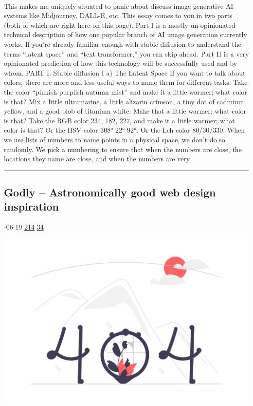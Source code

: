 \documentclass[10pt,a4paper]{article}
\begin{document}
\begin{multicols*}{2}
\paragraph{}
 This makes me uniquely situated to
panic about discuss image-generative AI systems like Midjourney, DALL-E, etc.
This essay comes to you in two parts (both of which are right here on this page).
Part I is a mostly-un-opinionated technical description of how one popular branch of AI image generation currently works. If you’re already familiar enough with stable diffusion to understand the terms “latent space” and “text transformer,” you can skip ahead.
Part II is a very opinionated prediction of how this technology will be successfully used and by whom.
PART I: Stable diffusion
I a) The Latent Space
If you want to talk about colors, there are more and less useful ways to name them for different tasks. Take the color “pinkish purplish autumn mist” and make it a little warmer; what color is that? Mix a little ultramarine, a little alizarin crimson, a tiny dot of cadmium yellow, and a good blob of titanium white. Make that a little warmer; what color is that? Take the RGB color
234, 182, 227, and make it a little warmer; what color is that? Or the HSV color
308° 22° 92°. Or the Lch color
80/30/330.
When we use lists of numbers to name points in a physical space, we don’t do so randomly.
We pick a numbering to ensure that when the numbers are close, the locations they name are close, and when the numbers are very
\par\noindent\textcolor{red}{\rule{\linewidth}{0.2mm}}
\vfill
\null
\noindent\begin{minipage}{\linewidth}
\subsection{Godly – Astronomically good web design inspiration}
\textsc{\footnotesize
{\scriptsize\faCalendar}-06-19 
{\scriptsize\faThumbsOUp}\space 
\href{http://news.ycombinator.com/item?id=37226805\&utm\_term=comment}{214} 
{\scriptsize\faComments}\space 
\href{http://news.ycombinator.com/item?id=37226805\&utm\_term=comment}{34} 
}
\par\medskip\noindent
\href{https://godly.website/?utm\_source=hackernewsletter\&utm\_medium=email\&utm\_term=design}{
    \includegraphics[width=0.99\linewidth]{notfound.png}
}
\end{minipage}

\end{multicols*}
\end{document}
